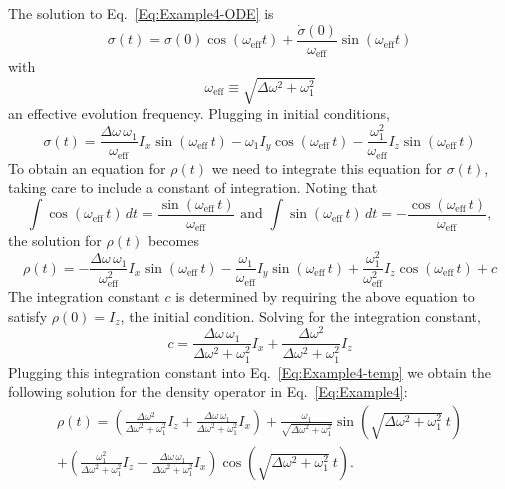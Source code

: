 The solution to Eq.~\ref{Eq:Example4-ODE} is
\begin{equation}
\sigma(t) 
	= \sigma(0) \cos{(\omega_{\text{eff}} t)}
	+ \frac{\dot{\sigma}(0)}{\omega_{\text{eff}}}
		\sin{(\omega_{\text{eff}} t)}
\end{equation}
with
\begin{equation}
\omega_{\text{eff}} \equiv \sqrt{\Delta\omega^2 + \omega_1^2}
\end{equation}
an effective evolution frequency.  Plugging in initial conditions,
\begin{equation}
\sigma(t) 
	= \frac{\Delta \omega \, \omega_1}{\omega_{\text{eff}}}
		I_x \sin{(\omega_{\text{eff}} \, t)}
	- \omega_1 I_y \cos{(\omega_{\text{eff}} \, t)}
	- \frac{\omega_1^2}{\omega_{\text{eff}}}
		I_z \sin{(\omega_{\text{eff}} \, t)}
\end{equation}
To obtain an equation for $\rho(t)$ we need to integrate this equation for $\sigma(t)$, taking care to include a constant of integration.  Noting that
\[
\int \cos{(\omega_{\text{eff}} \, t)} \, dt 
	= \frac{\sin{(\omega_{\text{eff}} \, t)}}
	       {\omega_{\text{eff}}}
\text{ and }
\int \sin{(\omega_{\text{eff}} \, t)} \, dt
	= - \frac{\cos{(\omega_{\text{eff}} \, t)}}
	       {\omega_{\text{eff}}},	       
\]
the solution for $\rho(t)$ becomes
\begin{equation}
\rho(t) 
	= - \frac{\Delta \omega \, \omega_1}{\omega_{\text{eff}}^2}
		I_x \sin{(\omega_{\text{eff}} \, t)}
	- \frac{\omega_1}{\omega_{\text{eff}}} 
		I_y \sin{(\omega_{\text{eff}} \, t)}
	+ \frac{\omega_1^2}{\omega_{\text{eff}}^2}
		I_z \cos{(\omega_{\text{eff}} \, t)}
	+ c
	\label{Eq:Example4-temp}
\end{equation}
The integration constant $c$ is determined by requiring the above equation to satisfy $\rho(0) = I_z$, the initial condition.  Solving for the integration constant,
\begin{equation}
c = \frac{\Delta\omega \, \omega_1}
         {\Delta\omega^2 + \omega_1^2} I_x
	+ \frac{\Delta\omega^2}
	       {\Delta\omega^2 + \omega_1^2} I_z
\end{equation}
Plugging this integration constant into Eq.~\ref{Eq:Example4-temp} we obtain the following solution for the density operator in Eq.~\ref{Eq:Example4}:
\begin{multline}
\rho(t) = \left( 
		\frac{\Delta\omega^2}
		     {\Delta\omega^2 + \omega_1^2} I_z
		+ \frac{\Delta\omega \, \omega_1}
		       {\Delta\omega^2 + \omega_1^2} I_x
	\right)
	+ 
	\frac{\omega_1}{\sqrt{\Delta\omega^2 + \omega_1^2}}
	\sin{(\sqrt{\Delta\omega^2 + \omega_1^2} \: t)}  
	\\ 
	+ 
	\left( 
		\frac{\omega_1^2}
		     {\Delta\omega^2 + \omega_1^2} I_z
		- \frac{\Delta\omega \, \omega_1}
		       {\Delta\omega^2 + \omega_1^2} I_x
	\right) 
	\cos{(\sqrt{\Delta\omega^2 + \omega_1^2} \: t)}.	
\end{multline}

